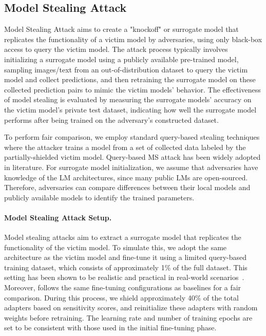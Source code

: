 \subsection{Model Stealing Attack}
Model Stealing Attack aims to create a "knockoff" or surrogate model that replicates the functionality of a victim model by adversaries, using only black-box access to query the victim model. The attack process typically involves initializing a surrogate model using a publicly available pre-trained model, sampling images/text from an out-of-distribution dataset to query the victim model and collect predictions, and then retraining the surrogate model on these collected prediction pairs to mimic the victim models' behavior. The effectiveness of model stealing is evaluated by measuring the surrogate models' accuracy on the victim model's private test dataset, indicating how well the surrogate model performs after being trained on the adversary's constructed dataset.

To perform fair comparison, we employ standard query-based stealing techniques where the attacker trains a model from a set of collected data labeled by the partially-shielded victim model. Query-based MS attack has been widely adopted in literature\cite{zhang2024no,AnonymousCoder2025Phantom,orekondy2019knockoff}. For surrogate model initialization, we assume that adversaries have knowledge of the LM architectures, since many public LMs are open-sourced. Therefore, adversaries can compare differences between their local models and publicly available models to identify the trained parameters.

\paragraph{Model Stealing Attack Setup.}
Model stealing attacks aim to extract a surrogate model that replicates the functionality of the victim model. To simulate this, we adopt the same architecture as the victim model and fine-tune it using a limited query-based training dataset, which consists of approximately 1\% of the full dataset. This setting has been shown to be realistic and practical in real-world scenarios~\cite{zhang2024no}. Moreover, \method follows the same fine-tuning configurations as baselines for a fair comparison. During this process, we shield approximately 40\% of the total adapters based on sensitivity scores, and reinitialize these adapters with random weights before retraining. The learning rate and number of training epochs are set to be consistent with those used in the initial fine-tuning phase.

